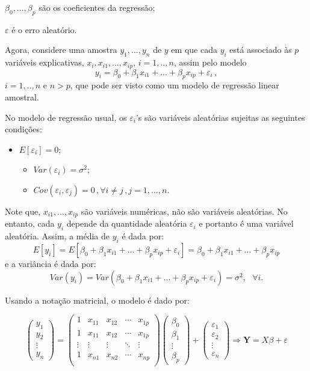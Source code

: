 \documentclass[]{article}
\providecommand{\tightlist}{%
  \setlength{\itemsep}{0pt}\setlength{\parskip}{0pt}}
\begin{document}
\(\beta_0,...,\beta_p\) são os coeficientes da regressão;

\(\varepsilon\) é o erro aleatório.

Agora, considere uma amostra \(y_1,...,y_n\) de \(y\) em que cada
\(y_i\) está associado às \(p\) variáveis explicativas,
\(x_i,x_{i1},...,x_{ip}\), \(i=1,..,n\), assim pelo modelo
\[y_i = \beta_0 + \beta_1x_{i1} + ... + \beta_px_{ip} + \varepsilon_i\,,\]
\(i=1,..,n\) e \(n>p\), que pode ser visto como um modelo de regressão
linear amostral.

No modelo de regressão usual, os \(\varepsilon_i\)'s são variáveis
aleatórias sujeitas as seguintes condições:

\begin{itemize}
\tightlist
\item
  \(E[\varepsilon_i] = 0\);

  \begin{itemize}
  \tightlist
  \item
    \(Var(\varepsilon_i) = \sigma^2\);
  \item
    \(Cov(\varepsilon_i,\varepsilon_j) = 0 \,, \forall i \neq j\,, j=1,...,n\).
  \end{itemize}
\end{itemize}

Note que, \(x_{i1},...,x_{ip}\) são variáveis numéricas, não são
variáveis aleatórias. No entanto, cada \(y_i\) depende da quantidade
aleatória \(\varepsilon_i\) e portanto é uma variável aleatória. Assim,
a média de \(y_i\) é dada por:
\[ E[y_i] = E[\beta_0 + \beta_1x_{i1} + ... + \beta_px_{ip} + \varepsilon_i] = \beta_0 + \beta_1x_{i1} + ... + \beta_px_{ip}\]
e a variância é dada por:
\[ Var(y_i) = Var(\beta_0 + \beta_1x_{i1} + ... + \beta_px_{ip} + \varepsilon_i) = \sigma^2, \ \ \  \forall i .\]

Usando a notação matricial, o modelo é dado por:

\[
\begin{pmatrix}
y_1 \\ y_2 \\ \vdots \\ y_n
\end{pmatrix}
=
\begin{pmatrix}
1 & x_{11} & x_{12} & \cdots & x_{1p} \\
1 & x_{11} & x_{12} & \cdots & x_{1p} \\
\vdots & \vdots & \vdots & \ddots & \vdots \\
1 & x_{n1} & x_{n2} & \cdots & x_{np} \\
\end{pmatrix}
\begin{pmatrix}
\beta_0 \\ \beta_1 \\ \vdots \\ \beta_p
\end{pmatrix}
+
\begin{pmatrix}
\varepsilon_1 \\ \varepsilon_2 \\ \vdots \\ \varepsilon_n
\end{pmatrix}
\Rightarrow
\textbf{Y}= X  \beta+   \varepsilon
\]
\end{document}
